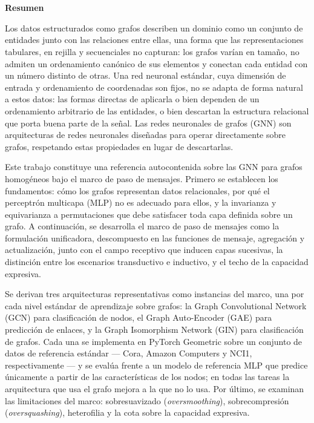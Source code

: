 \thispagestyle{plain}
\begin{fullwidth}
\begin{center}
    \LARGE
    \textcolor{itesodblue}{\textbf{\mytitle}}\\
    \Large
    \vspace{0.4cm}
    \textcolor{itesomblue}{\textbf{\myauthor}}\\
    \vspace{0.9cm}
    \textcolor{itesolblue}{\textbf{Resumen}}
\end{center}
Los datos estructurados como grafos describen un dominio como un conjunto de
entidades junto con las relaciones entre ellas, una forma que las
representaciones tabulares, en rejilla y secuenciales no capturan: los grafos
varían en tamaño, no admiten un ordenamiento canónico de sus elementos y
conectan cada entidad con un número distinto de otras. Una red neuronal
estándar, cuya dimensión de entrada y ordenamiento de coordenadas son fijos, no
se adapta de forma natural a estos datos: las formas directas de aplicarla o
bien dependen de un ordenamiento arbitrario de las entidades, o bien descartan
la estructura relacional que porta buena parte de la señal.
Las redes neuronales de grafos (GNN) son arquitecturas
de redes neuronales diseñadas para operar directamente sobre grafos, respetando
estas propiedades en lugar de descartarlas.

Este trabajo constituye una referencia autocontenida sobre las GNN para grafos
homogéneos bajo el marco de paso de mensajes. Primero se establecen los
fundamentos: cómo los grafos representan datos relacionales, por qué el
perceptrón multicapa (MLP) no es adecuado para ellos, y la invarianza y equivarianza a
permutaciones que debe satisfacer toda capa definida sobre un grafo. A
continuación, se desarrolla el marco de paso de mensajes como la formulación
unificadora, descompuesto en las funciones de mensaje, agregación y
actualización, junto con el campo receptivo que inducen capas sucesivas, la
distinción entre los escenarios transductivo e inductivo, y el techo de la
capacidad expresiva.

Se derivan tres arquitecturas representativas como instancias del marco, una por
cada nivel estándar de aprendizaje sobre grafos: la Graph Convolutional Network (GCN)
para clasificación de nodos, el Graph Auto-Encoder (GAE) para predicción de
enlaces, y la Graph Isomorphism Network (GIN) para clasificación de grafos. Cada
una se implementa en PyTorch Geometric sobre un conjunto de datos de referencia
estándar --- Cora, Amazon Computers y NCI1, respectivamente --- y se evalúa
frente a un modelo de referencia MLP que predice únicamente a partir de las
características de los nodos; en todas las tareas la arquitectura que usa el
grafo mejora a la que no lo usa. Por último, se examinan las limitaciones del
marco: sobresuavizado (\textit{oversmoothing}), sobrecompresión
(\textit{oversquashing}), heterofilia y la cota sobre la capacidad expresiva.
\end{fullwidth}